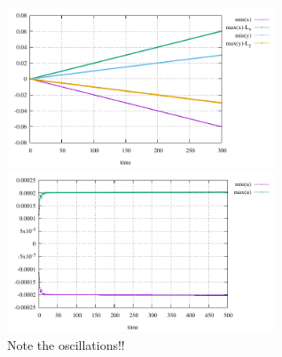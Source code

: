 \begin{center}
\includegraphics[width=8cm]{python_codes/fieldstone_129/results/experiment5/size}
\includegraphics[width=8cm]{python_codes/fieldstone_129/results/experiment5/velx}\\
{\captionfont Note the oscillations!!}
\end{center}












